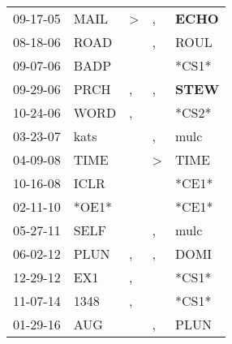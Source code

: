 \begin{supertabular}{p{0.07\textwidth}p{0.06\textwidth}p{0.02\textwidth}p{0.02\textwidth}p{0.06\textwidth}}
 09-17-05\textsuperscript{} &           MAIL\textsuperscript{} &     \textgreater &             , &  \textbf{ECHO\textsuperscript{}} \\
 08-18-06\textsuperscript{} &           ROAD\textsuperscript{} &                  &             , &           ROUL\textsuperscript{} \\
 09-07-06\textsuperscript{} &           BADP\textsuperscript{} &                  &               &                            *CS1* \\
 09-29-06\textsuperscript{} &           PRCH\textsuperscript{} &                , &             , &  \textbf{STEW\textsuperscript{}} \\
 10-24-06\textsuperscript{} &           WORD\textsuperscript{} &                , &               &                            *CS2* \\
 03-23-07\textsuperscript{} &           kats\textsuperscript{} &                  &             , &           mulc\textsuperscript{} \\
 04-09-08\textsuperscript{} &           TIME\textsuperscript{} &                  &  \textgreater &           TIME\textsuperscript{} \\
 10-16-08\textsuperscript{} &           ICLR\textsuperscript{} &                  &               &                            *CE1* \\
 02-11-10\textsuperscript{} &                            *OE1* &                  &               &                            *CE1* \\
 05-27-11\textsuperscript{} &           SELF\textsuperscript{} &                  &             , &           mulc\textsuperscript{} \\
 06-02-12\textsuperscript{} &           PLUN\textsuperscript{} &                , &             , &           DOMI\textsuperscript{} \\
 12-29-12\textsuperscript{} &            EX1\textsuperscript{} &                , &               &                            *CS1* \\
 11-07-14\textsuperscript{} &           1348\textsuperscript{} &                , &               &                            *CS1* \\
 01-29-16\textsuperscript{} &            AUG\textsuperscript{} &                  &             , &           PLUN\textsuperscript{} \\
\end{supertabular}
